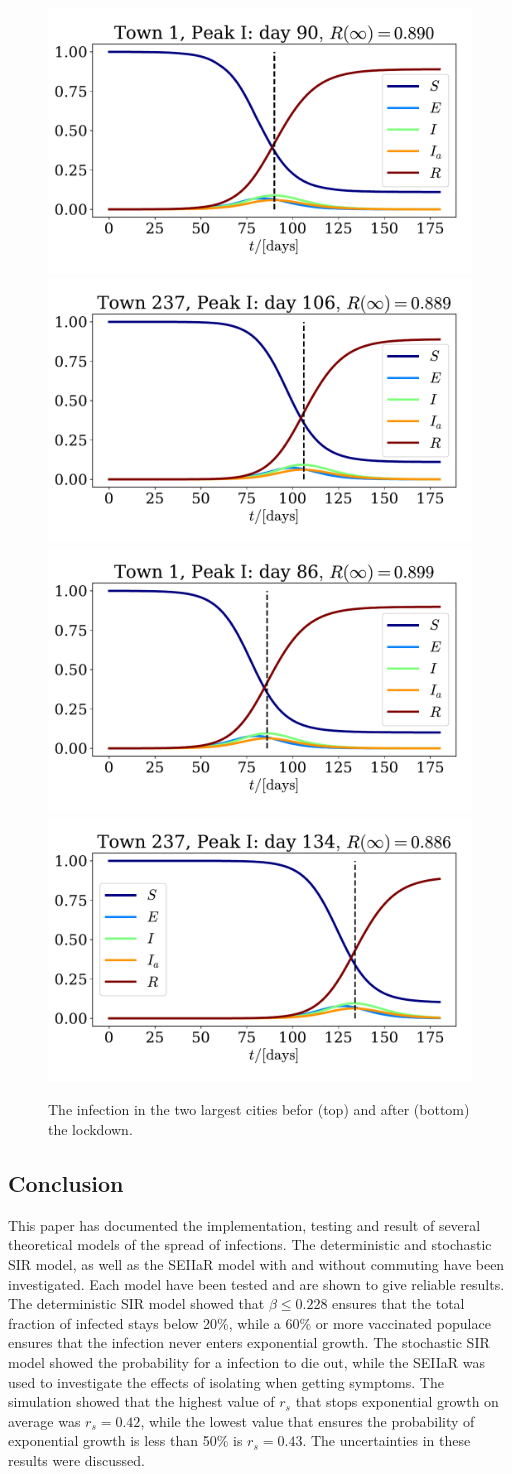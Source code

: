 \documentclass{article}
\begin{document}
    \begin{figure}[H]
        \centering
        \includegraphics[width=.4\textwidth]{../plots/2D/Oslo.pdf}
        \includegraphics[width=.4\textwidth]{../plots/2D/Bergen.pdf}
        \includegraphics[width=.4\textwidth]{../plots/2D/Oslolockdown.pdf}
        \includegraphics[width=.4\textwidth]{../plots/2D/Bergenlockdown.pdf}
        \caption{The infection in the two largest cities befor (top) and after (bottom) the lockdown.}
        \label{Oslo Bergen}
    \end{figure}
    
    \subsection*{Conclusion}
    This paper has documented the implementation, testing and result of several theoretical models of the spread of infections.
    The deterministic and stochastic SIR model, as well as the SEIIaR model with and without commuting have been investigated.
    Each model have been tested and are shown to give reliable results.
    The deterministic SIR model showed that $\beta \leq 0.228$ ensures that the total fraction of infected stays below 20\%, while a 60\% or more vaccinated populace ensures that the infection never enters exponential growth.
    The stochastic SIR model showed the probability for a infection to die out, while the SEIIaR was used to investigate the effects of isolating when getting symptoms.
    The simulation showed that the highest value of $r_s$ that stops exponential growth on average was $r_s=0.42$, while the lowest value that ensures the probability of exponential growth is less than 50\% is $r_s=0.43$. 
    The uncertainties in these results were discussed.
\end{document}
